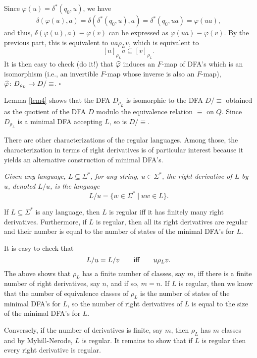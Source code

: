 \medskip
Since $\varphi(u) = \delta^*(q_0, u)$, we have
$$\delta(\varphi(u), a) = \delta(\delta^*(q_0, u), a) = \delta^*(q_0, ua)
= \varphi(ua),$$
and thus, $\delta(\varphi(u), a)\equiv \varphi(v)$ can be expressed
as $\varphi(ua)\equiv \varphi(v)$. By the previous part,
this is equivalent to $ua\rho_L v$, which 
is equivalent to
$$[u]_{\rho_{L}} a \subseteq [v]_{\rho_{L}}.$$
It is then easy to check (do it!) that  $\widehat{\varphi}$
induces an $F$-map of DFA's which is an  isomorphism
(i.e., an invertible $F$-map whose  inverse is also an $F$-map),
$\widehat{\varphi}\colon D_{\rho_L}\rightarrow D/\equiv$.
$\square$

\medskip
Lemma \ref{lem4} shows that the DFA $D_{\rho_{L}}$
is isomorphic to the  DFA $D/\equiv$ obtained as the quotient
of the DFA $D$ modulo the equivalence relation $\equiv$ on $Q$.
Since $D_{\rho_{L}}$ is a minimal DFA accepting $L$,
so is $D/\equiv$.

\medskip
There are other characterizations of the regular languages.
Among those, the characterization in terms of right derivatives
is of particular interest because it yields an alternative construction
of minimal DFA's.

\begin{defin}
\label{rightderiv}
{\em 
Given any language, $L \subseteq \Sigma^*$, for any
string, $u\in \Sigma^*$, the {\it right derivative of $L$ by $u$\/},
denoted $L/u$, is the language
\[
L/u = \{w\in \Sigma^* \mid uw\in L\}.
\]
}
\end{defin}

\begin{thm}
\label{regderivthm}
If $L\subseteq \Sigma^*$ is any language, then $L$ is regular iff
it has finitely many right derivatives. Furthermore, 
if $L$ is regular, then all its right derivatives are regular and
their number is equal to the number of states of the minimal DFA's for $L$.
\end{thm}

\proof
It is easy to check that
\[
L/u = L/v \qquad\hbox{iff}\qquad
u \rho_L v.
\]
The above shows that $\rho_L$ has a finite number of classes,
say $m$, 
iff there is a finite number of right derivatives, say $n$, and if so,
$m = n$.
If $L$ is regular, then we know that the number of equivalence
classes of $\rho_L$ is the number of states of the minimal DFA's for $L$,
so the number of right derivatives of $L$
is equal to the size of the minimal DFA's for $L$.

\medskip
Conversely, if  the number of derivatives is finite, say $m$,
then $\rho_L$ has $m$ classes and by Myhill-Nerode, $L$ is regular.
It remains to show that if $L$ is regular then
every right derivative is regular. 

